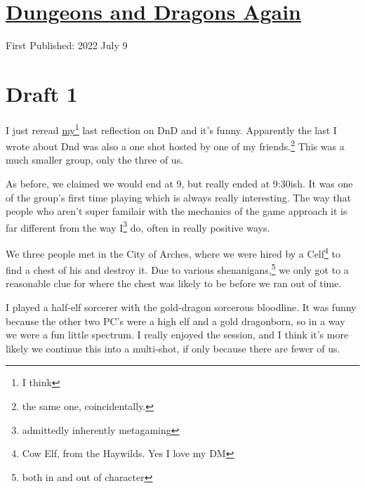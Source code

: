 \documentclass[12pt]{article}[titlepage]
\renewcommand{\,}{\textsuperscript{,}}
\begin{document}
\doublespacing
\section{\href{dungeons-dragons-2.html}{Dungeons and Dragons Again}}
First Published: 2022 July 9

\section{Draft 1}
I just reread \href{dungeons-dragons.html}{my\footnote{I think} last reflection on DnD} and it's funny.
Apparently the last I wrote about Dnd was also a one shot hosted by one of my friends.\footnote{the same one, coincidentally.}
This was a much smaller group, only the three of us.

As before, we claimed we would end at 9, but really ended at 9:30ish.
It was one of the group's first time playing which is always really interesting.
The way that people who aren't super familair with the mechanics of the game approach it is far different from the way I\footnote{admittedly inherently metagaming} do, often in really positive ways.

We three people met in the City of Arches, where we were hired by a Celf\footnote{Cow Elf, from the Haywilds. Yes I love my DM} to find a chest of his and destroy it.
Due to various shenanigans,\footnote{both in and out of character} we only got to a reasonable clue for where the chest was likely to be before we ran out of time.

I played a half-elf sorcerer with the gold-dragon sorcerous bloodline.
It was funny because the other two PC's were a high elf and a gold dragonborn, so in a way we were a fun little spectrum.
I really enjoyed the session, and I think it's more likely we continue this into a multi-shot, if only because there are fewer of us.
\end{document}
